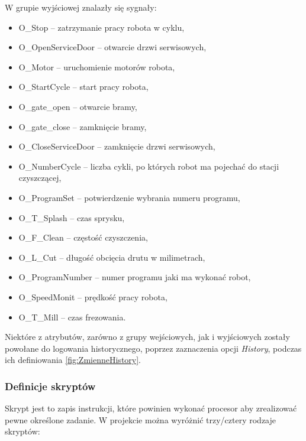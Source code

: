 W grupie wyjściowej znalazły się sygnały:
\begin{itemize}
\item	O\_Stop – zatrzymanie pracy robota w cyklu,
\item	O\_OpenServiceDoor – otwarcie drzwi serwisowych, 
\item	O\_Motor – uruchomienie motorów robota, 
\item	O\_StartCycle – start pracy robota, 
\item	O\_gate\_open – otwarcie bramy,
\item	O\_gate\_close – zamknięcie bramy,
\item	O\_CloseServiceDoor – zamknięcie drzwi serwisowych,
\item	O\_NumberCycle – liczba cykli, po których robot ma pojechać do stacji czyszczącej,
\item	O\_ProgramSet – potwierdzenie wybrania numeru programu,
\item	O\_T\_Splash – czas sprysku,
\item	O\_F\_Clean – częstość czyszczenia,
\item	O\_L\_Cut – długość obcięcia drutu w milimetrach,
\item	O\_ProgramNumber – numer programu jaki ma wykonać robot,
\item	O\_SpeedMonit – prędkość pracy robota,
\item	O\_T\_Mill – czas frezowania.
\end{itemize}

Niektóre z atrybutów, zarówno z grupy wejściowych, jak i wyjściowych zostały powołane do logowania historycznego, poprzez zaznaczenia opcji \textit{History}, podczas ich definiowania \ref{fig:ZmienneHistory}.


\subsubsection{Definicje skryptów}
Skrypt jest to zapis instrukcji, które powinien wykonać procesor aby zrealizować pewne określone zadanie.  W projekcie można wyróżnić trzy/cztery rodzaje skryptów:

